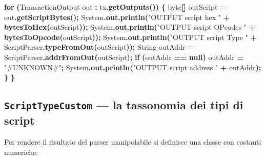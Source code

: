 \documentclass[
  italian,
  openany]{book}
\newenvironment{Shaded}{\begin{snugshade}}{\end{snugshade}}
\newcommand{\BuiltInTok}[1]{#1}
\newcommand{\ControlFlowTok}[1]{\textcolor[rgb]{0.13,0.29,0.53}{\textbf{#1}}}
\newcommand{\DataTypeTok}[1]{\textcolor[rgb]{0.13,0.29,0.53}{#1}}
\newcommand{\FunctionTok}[1]{\textcolor[rgb]{0.13,0.29,0.53}{\textbf{#1}}}
\newcommand{\KeywordTok}[1]{\textcolor[rgb]{0.13,0.29,0.53}{\textbf{#1}}}
\newcommand{\NormalTok}[1]{#1}
\newcommand{\OperatorTok}[1]{\textcolor[rgb]{0.81,0.36,0.00}{\textbf{#1}}}
\newcommand{\StringTok}[1]{\textcolor[rgb]{0.31,0.60,0.02}{#1}}
\begin{document}
\begin{Shaded}
\begin{Highlighting}[]
    \ControlFlowTok{for} \OperatorTok{(}\NormalTok{TransactionOutput out }\OperatorTok{:}\NormalTok{ tx}\OperatorTok{.}\FunctionTok{getOutputs}\OperatorTok{())} \OperatorTok{\{}
        \DataTypeTok{byte}\OperatorTok{[]}\NormalTok{ outScript }\OperatorTok{=}\NormalTok{ out}\OperatorTok{.}\FunctionTok{getScriptBytes}\OperatorTok{();}
        \BuiltInTok{System}\OperatorTok{.}\FunctionTok{out}\OperatorTok{.}\FunctionTok{println}\OperatorTok{(}\StringTok{"OUTPUT script hex "}     \OperatorTok{+} \FunctionTok{bytesToHex}\OperatorTok{(}\NormalTok{outScript}\OperatorTok{));}
        \BuiltInTok{System}\OperatorTok{.}\FunctionTok{out}\OperatorTok{.}\FunctionTok{println}\OperatorTok{(}\StringTok{"OUTPUT script OPcodes "} \OperatorTok{+} \FunctionTok{bytesToOpcode}\OperatorTok{(}\NormalTok{outScript}\OperatorTok{));}
        \BuiltInTok{System}\OperatorTok{.}\FunctionTok{out}\OperatorTok{.}\FunctionTok{println}\OperatorTok{(}\StringTok{"OUTPUT script Type "}    \OperatorTok{+}\NormalTok{ ScriptParser}\OperatorTok{.}\FunctionTok{typeFromOut}\OperatorTok{(}\NormalTok{outScript}\OperatorTok{));}
        \BuiltInTok{String}\NormalTok{ outAddr }\OperatorTok{=}\NormalTok{ ScriptParser}\OperatorTok{.}\FunctionTok{addrFromOut}\OperatorTok{(}\NormalTok{outScript}\OperatorTok{);}
        \ControlFlowTok{if} \OperatorTok{(}\NormalTok{outAddr }\OperatorTok{==} \KeywordTok{null}\OperatorTok{)}\NormalTok{ outAddr }\OperatorTok{=} \StringTok{"\#UNKNOWN\#"}\OperatorTok{;}
        \BuiltInTok{System}\OperatorTok{.}\FunctionTok{out}\OperatorTok{.}\FunctionTok{println}\OperatorTok{(}\StringTok{"OUTPUT script address "} \OperatorTok{+}\NormalTok{ outAddr}\OperatorTok{);}
    \OperatorTok{\}}
\OperatorTok{\}}
\end{Highlighting}
\end{Shaded}

\subsection{\texorpdfstring{\texttt{ScriptTypeCustom} --- la tassonomia
dei tipi di
script}{ScriptTypeCustom --- la tassonomia dei tipi di script}}\label{scripttypecustom-la-tassonomia-dei-tipi-di-script}

Per rendere il risultato del parser manipolabile si definisce una classe
con costanti numeriche:
\end{document}
